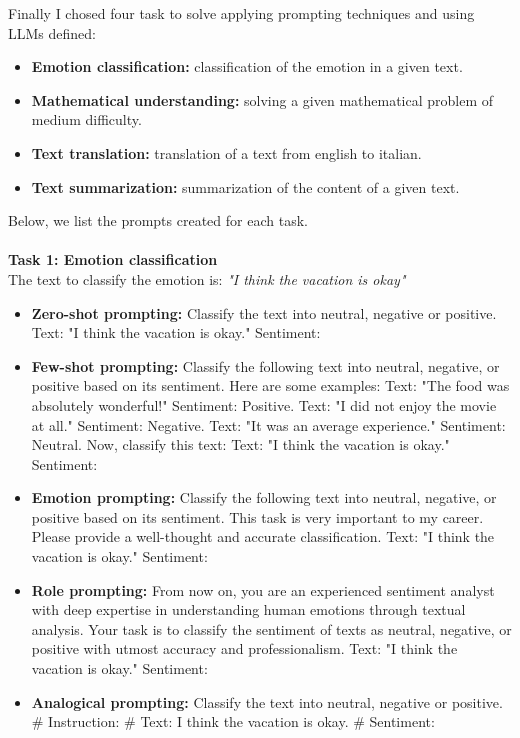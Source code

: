 Finally I chosed four task to solve applying prompting techniques and using LLMs defined:
\begin{itemize}
    \item \textbf{Emotion classification:} classification of the emotion in a given text.

    \item \textbf{Mathematical understanding:} solving a given mathematical problem of medium difficulty. 

    \item \textbf{Text translation:} translation of a text from english to italian.

    \item \textbf{Text summarization:} summarization of the content of a given text.
\end{itemize}
Below, we list the prompts created for each task.\\\\
\textbf{Task 1: Emotion classification}\\     
The text to classify the emotion is: \textit{"I think the vacation is okay"}
\begin{itemize}
    \item \textbf{Zero-shot prompting:} Classify the text into neutral, negative or positive. Text: "I think the vacation is okay." Sentiment:
    \item \textbf{Few-shot prompting:} Classify the following text into neutral, negative, or positive based on its sentiment. Here are some examples: 
    Text: "The food was absolutely wonderful!" Sentiment: Positive. 
    Text: "I did not enjoy the movie at all." Sentiment: Negative. 
    Text: "It was an average experience." Sentiment: Neutral. 
    Now, classify this text: Text: "I think the vacation is okay." Sentiment:
    \item \textbf{Emotion prompting:} Classify the following text into neutral, negative, or positive based on its sentiment. This task is very important to my career. Please provide a well-thought and accurate classification. Text: "I think the vacation is okay." Sentiment:
    \item \textbf{Role prompting:} From now on, you are an experienced sentiment analyst with deep expertise in understanding human emotions through textual analysis. Your task is to classify the sentiment of texts as neutral, negative, or positive with utmost accuracy and professionalism. Text: "I think the vacation is okay." Sentiment:
    \item \textbf{Analogical prompting:} Classify the text into neutral, negative or positive. \# Instruction: \# Text: I think the vacation is okay. \# Sentiment:
\end{itemize}
